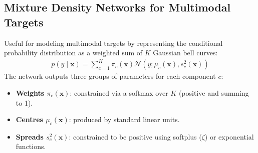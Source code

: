 \subsection{Mixture Density Networks for Multimodal Targets}
Useful for modeling multimodal targets by representing the conditional probability distribution as a weighted sum of $K$ Gaussian bell curves:
\begin{align*}
p(y \mid \mathbf{x}) = \sum_{c=1}^{K} \pi_c(\mathbf{x}) \mathcal{N}(y; \mu_c(\mathbf{x}), s_c^2(\mathbf{x}))
\end{align*}
The network outputs three groups of parameters for each component $c$:
\begin{itemize}
\item \textbf{Weights $\pi_c(\mathbf{x})$}: constrained via a softmax over $K$ (positive and summing to 1).
\item \textbf{Centres $\mu_c(\mathbf{x})$}: produced by standard linear units.
\item \textbf{Spreads $s_c^2(\mathbf{x})$}: constrained to be positive using softplus ($\zeta$) or exponential functions.
\end{itemize}